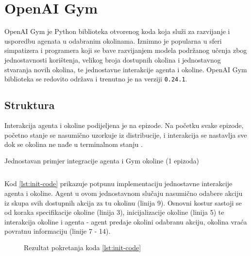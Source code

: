 \chapter{OpenAI Gym}

OpenAI Gym je Python biblioteka  otvorenog koda  koja služi za razvijanje i usporedbu agenata u odabranim okolinama. Iznimno je popularna u sferi simpatizera i programera koji se bave razvijanjem modela podržanog učenja zbog jednostavnosti korištenja, velikog broja dostupnih okolina i jednostavnog stvaranja novih okolina, te jednostavne interakcije agenta i okoline. OpenAI Gym biblioteka se redovito održava i trenutno je na verziji \texttt{0.24.1}. 

\section{Struktura}

Interakcija agenta i okoline podijeljena je na epizode. Na početku svake epizode, početno stanje se nasumično uzorkuje iz distribucije, i interakcija se nastavlja sve dok se okolina ne nađe u terminalnom stanju \cite{OpenAIWhitepaper}.

\begin{listing}[H]
    \caption{Jednostavan primjer integracije agenta i Gym okoline (1 epizoda)}
    \inputminted{python}{snippets/init.py}
    \label{lst:init-code}
\end{listing}

Kod \ref{lst:init-code} prikazuje potpunu implementaciju jednostavne interakcije agenta i okoline. Agent u ovom jednostavnom slučaju nasumično odabere akciju iz skupa svih dostupnih akcija za tu okolinu (linija 9). Osnovni kostur sastoji se od koraka specifikacije okoline (linija 3), inicijalizacije okoline (linija 5) te interakcija okoline i agenta - agent predaje okolini odabranu akciju, okolina vraća povratnu informaciju (linije 7 - 14). 

\begin{figure}[h]
    \centering
    \caption{Rezultat pokretanja koda \ref{lst:init-code}}
    \label{fig:mountain-car}
\end{figure}

